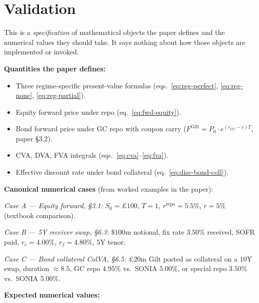 \documentclass[11pt,a4paper]{article}
\begin{document}
\section{Validation}

\begin{validation}
This is a \emph{specification} of mathematical objects the paper
defines and the numerical values they should take. It says nothing
about how those objects are implemented or invoked.

\textbf{Quantities the paper defines:}
\begin{itemize}[noitemsep]
  \item Three regime-specific present-value formulas
        (eqs.~\ref{eq:reg-perfect}, \ref{eq:reg-none}, \ref{eq:reg-partial}).
  \item Equity forward price under repo (eq.~\ref{eq:fwd-equity}).
  \item Bond forward price under GC repo with coupon carry
        ($F^{\text{Gilt}} = P_0 \cdot e^{(r_{GC} - c) T}$, paper \S3.2).
  \item CVA, DVA, FVA integrals (eqs.~\ref{eq:cva}--\ref{eq:fva}).
  \item Effective discount rate under bond collateral
        (eq.~\ref{eq:disc-bond-coll}).
\end{itemize}

\textbf{Canonical numerical cases} (from worked examples in the paper):

\smallskip
\textit{Case A --- Equity forward, \S3.1:}
$S_0 = \pounds 100$, $T = 1$, $r^{\text{repo}} = 5.5\%$, $r = 5\%$ (textbook comparison).

\smallskip
\textit{Case B --- 5Y receiver swap, \S6.3:}
$\$100$m notional, fix rate $3.50\%$ received, SOFR paid,
$r_c = 4.00\%$, $r_f = 4.80\%$, $5$Y tenor.

\smallskip
\textit{Case C --- Bond collateral ColVA, \S6.5:}
$\pounds 20$m Gilt posted as collateral on a 10Y swap, duration $\approx 8.5$,
GC repo $4.95\%$ vs.\ SONIA $5.00\%$, or special repo $3.50\%$ vs.\
SONIA $5.00\%$.

\textbf{Expected numerical values:}


\end{validation}
\end{document}
